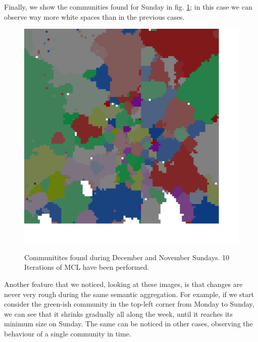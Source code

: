 \documentclass[12pt,a4paper]{article}
\begin{document}
Finally, we show the communities found for Sunday in fig. \ref{fig:sunday}; in this case we can observe way more white spaces than in the previous cases.

\begin{figure}[H]
\includegraphics[width=\linewidth]{week/7Sun.png}
\label{fig:sunday}
\caption{Communitites found during December and November Sundays. 10 Iterations of MCL have been performed.}
\end{figure}

Another feature that we noticed, looking at these images, is that changes are never very rough during the same semantic aggregation.
For example, if we start consider the green-ish community in the top-left corner from Monday to Sunday, we can see that it shrinks gradually all along the week, until it reaches its minimum size on Sunday. The same can be noticed in other cases, observing the behaviour of a single community in time. 
\end{document}
